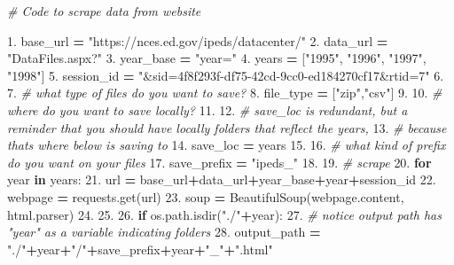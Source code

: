 \documentclass[
]{book}
\newenvironment{Shaded}{\begin{snugshade}}{\end{snugshade}}
\newcommand{\CommentTok}[1]{\textcolor[rgb]{0.56,0.35,0.01}{\textit{#1}}}
\newcommand{\ControlFlowTok}[1]{\textcolor[rgb]{0.13,0.29,0.53}{\textbf{#1}}}
\newcommand{\FloatTok}[1]{\textcolor[rgb]{0.00,0.00,0.81}{#1}}
\newcommand{\KeywordTok}[1]{\textcolor[rgb]{0.13,0.29,0.53}{\textbf{#1}}}
\newcommand{\NormalTok}[1]{#1}
\newcommand{\OperatorTok}[1]{\textcolor[rgb]{0.81,0.36,0.00}{\textbf{#1}}}
\newcommand{\StringTok}[1]{\textcolor[rgb]{0.31,0.60,0.02}{#1}}
\begin{document}
\begin{Shaded}
\begin{Highlighting}[]
\CommentTok{\# Code to scrape data from website}

\FloatTok{1.}\NormalTok{  base\_url }\OperatorTok{=} \StringTok{"https://nces.ed.gov/ipeds/datacenter/"}
\FloatTok{2.}\NormalTok{  data\_url }\OperatorTok{=} \StringTok{"DataFiles.aspx?"}
\FloatTok{3.}\NormalTok{  year\_base }\OperatorTok{=} \StringTok{"year="}
\FloatTok{4.}\NormalTok{  years }\OperatorTok{=}\NormalTok{ [}\StringTok{"1995"}\NormalTok{, }\StringTok{"1996"}\NormalTok{, }\StringTok{"1997"}\NormalTok{, }\StringTok{"1998"}\NormalTok{]}
\FloatTok{5.}\NormalTok{  session\_id }\OperatorTok{=} \StringTok{"\&sid=4f8f293f{-}df75{-}42cd{-}9cc0{-}ed184270cf17\&rtid=7"}
\FloatTok{6.} 
\FloatTok{7.}  \CommentTok{\# what type of files do you want to save?}
\FloatTok{8.}\NormalTok{  file\_type }\OperatorTok{=}\NormalTok{ [}\StringTok{"zip"}\NormalTok{,}\StringTok{"csv"}\NormalTok{]}
\FloatTok{9.} 
\FloatTok{10.} \CommentTok{\# where do you want to save locally?}
\FloatTok{11.} 
\FloatTok{12.} \CommentTok{\# save\_loc is redundant, but a reminder that you should have locally folders that reflect the years, }
\FloatTok{13.} \CommentTok{\# because that\textquotesingle{}s where below is saving to}
\FloatTok{14.}\NormalTok{ save\_loc }\OperatorTok{=}\NormalTok{ years }
\FloatTok{15.} 
\FloatTok{16.} \CommentTok{\# what kind of prefix do you want on your files}
\FloatTok{17.}\NormalTok{ save\_prefix }\OperatorTok{=} \StringTok{"ipeds\_"} 
\FloatTok{18.} 
\FloatTok{19.} \CommentTok{\# scrape}
\FloatTok{20.} \ControlFlowTok{for}\NormalTok{ year }\KeywordTok{in}\NormalTok{ years:}
\FloatTok{21.}\NormalTok{     url }\OperatorTok{=}\NormalTok{ base\_url}\OperatorTok{+}\NormalTok{data\_url}\OperatorTok{+}\NormalTok{year\_base}\OperatorTok{+}\NormalTok{year}\OperatorTok{+}\NormalTok{session\_id }
\FloatTok{22.}\NormalTok{     webpage }\OperatorTok{=}\NormalTok{ requests.get(url)}
\FloatTok{23.}\NormalTok{     soup }\OperatorTok{=}\NormalTok{ BeautifulSoup(webpage.content, }\StringTok{\textquotesingle{}html.parser\textquotesingle{}}\NormalTok{)}
\FloatTok{24.} 
\FloatTok{25.} 
\FloatTok{26.}     \ControlFlowTok{if}\NormalTok{ os.path.isdir(}\StringTok{"./"}\OperatorTok{+}\NormalTok{year):}
\FloatTok{27.}         \CommentTok{\# notice output path has "year" as a variable indicating folders}
\FloatTok{28.}\NormalTok{         output\_path }\OperatorTok{=} \StringTok{"./"}\OperatorTok{+}\NormalTok{year}\OperatorTok{+}\StringTok{"/"}\OperatorTok{+}\NormalTok{save\_prefix}\OperatorTok{+}\NormalTok{year}\OperatorTok{+}\StringTok{"\_"}\OperatorTok{+}\StringTok{".html"}

\end{Highlighting}
\end{Shaded}
\end{document}
